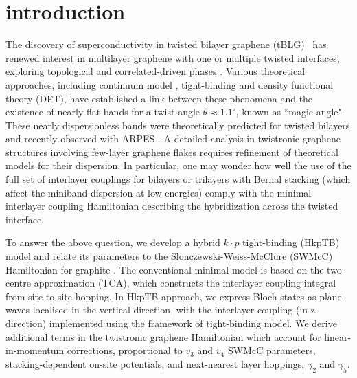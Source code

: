 \documentclass[showpacs,aps,prb,reprint,twocolumn]{revtex4-1}
\begin{document}
\section{introduction}
\label{sec:int}
The discovery of superconductivity in twisted bilayer graphene (tBLG)~\cite{Cao_2018-1,Cao_2018-2, Yankowitz_2019,Lu_2019,Cao_2020-1} has renewed interest in multilayer graphene with one \cite{Sharpe_2019, Polshyn_2020, Shi_2020, Chen_2019-1, Burg_2019, Shen_2020, Chen_2020, Cao_2020-2, Cao_2020-2, Liu_2020, Rickhaus_2020} or multiple \cite{Tsai_2020,Park_2021,Hao_2021} twisted interfaces, exploring topological and correlated-driven phases \cite{Sharpe_2019, Polshyn_2020, Shi_2020, Chen_2019-1, Burg_2019, Shen_2020, Chen_2020, Cao_2020-2, Cao_2020-2, Liu_2020, Rickhaus_2020}. Various theoretical approaches, including continuum model \cite{Lopes_2007, Bistritzer_2011, Koshino_2015, Lopes_2012, Mele_2011, Nguyen_2017, Moon_2012, Moon_2013}, tight-binding \cite{Moon_2012, Moon_2013, Morell_2010, Sboychakov_2015, Po_2019, Lin_2020, Carr_2019} and density functional theory (DFT)\cite{Carr_2019, Trambly_2010, Trambly_2012, Uchida_2014, Lucignano_2019}, have established a link between these phenomena and the existence of nearly flat bands for a twist angle $\theta\approx1.1^\circ$, known as ``magic angle"\cite{Tarnopolsky_2019}. These nearly dispersionless bands were theoretically predicted for twisted bilayers \cite{Bistritzer_2011} and recently observed with ARPES \cite{Utama_2021}. A detailed analysis in twistronic graphene structures involving few-layer graphene flakes requires refinement of theoretical models for their dispersion. In particular, one may wonder how well the use of the full set of interlayer couplings for bilayers or trilayers with Bernal stacking (which affect the miniband dispersion at low energies) comply with the minimal interlayer coupling Hamiltonian describing the hybridization across the twisted interface\cite{Lopes_2007,Bistritzer_2011}. 

To answer the above question, we develop a hybrid $k\cdot p$ tight-binding (HkpTB) model and relate its parameters to the Slonczewski-Weiss-McClure (SWMcC) Hamiltonian for graphite \cite{Slonczewski_1958, McClure_1957, McClure_1960}. The conventional minimal model \cite{Lopes_2007, Bistritzer_2011} is based on the two-centre approximation \cite{Lopes_2012, Koshino_2015} (TCA), which constructs the interlayer coupling integral from site-to-site hopping. In HkpTB approach, we express Bloch states as plane-waves localised in the vertical direction, with the interlayer coupling (in z-direction) implemented using the framework of tight-binding model. We derive additional terms in the twistronic graphene Hamiltonian which account for linear-in-momentum corrections, proportional to $v_3$ and $v_4$ SWMcC parameters, stacking-dependent on-site potentials, and next-nearest layer hoppings, $\gamma_2$ and $\gamma_5$.
\end{document}
